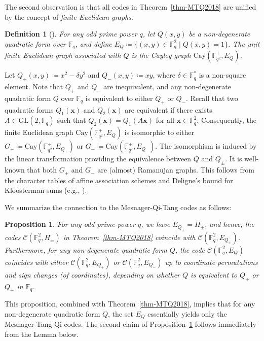 \documentclass{amsart}
\newtheorem{proposition}[theorem]{Proposition}
\newtheorem{definition}[theorem]{Definition}
\numberwithin{equation}{section}
\begin{document}
The second observation is that all codes in Theorem~\ref{thm-MTQ2018} are unified by the concept of {\it finite Euclidean graphs}.

\begin{definition}[\cite{BST2009, MMST1996}]
For any odd prime power $q$, let $Q(x, y)$ be a non-degenerate quadratic form over $\mathbb{F}_q$, and define $E_Q \coloneq \{(x,y) \in \mathbb{F}_q^2 \mid Q(x,y)=1\}$.
The {\it unit finite Euclidean graph} associated with $Q$ is the Cayley graph $\mathrm{Cay}(\mathbb{F}_{q^2}^+, E_Q)$.
\end{definition}

Let $Q_+(x,y) \coloneq x^2-\delta y^2$ and $Q_-(x,y) \coloneq xy$, where $\delta \in \mathbb{F}_q^*$ is a non-square element.
Note that $Q_+$ and $Q_-$ are inequivalent, and any non-degenerate quadratic form $Q$ over $\mathbb{F}_q$ is equivalent to either $Q_+$ or $Q_-$.
Recall that two quadratic forms $Q_1(\mathbf{x})$ and $Q_2(\mathbf{x})$ are equivalent if there exists $A \in \mathrm{GL}(2, \mathbb{F}_q)$ such that $Q_2(\mathbf{x})=Q_1(A\mathbf{x})$ for all $\mathbf{x} \in \mathbb{F}_q^2$.
Consequently, the finite Euclidean graph $\mathrm{Cay}(\mathbb{F}_{q^2}^+, E_Q)$ is isomorphic to either $G_+ \coloneq \mathrm{Cay}(\mathbb{F}_{q^2}^+, E_{Q_+})$ or $G_- \coloneq \mathrm{Cay}(\mathbb{F}_{q^2}^+, E_{Q_-})$. The isomorphism is induced by the linear transformation providing the equivalence between $Q$ and $Q_{\pm}$.
It is well-known that both $G_+$ and $G_-$ are (almost) Ramanujan graphs. This follows from the character tables of affine association schemes and Deligne's bound for Kloosterman sums (e.g., \cite{BST2009, MMST1996, D2023}).

We summarize the connection to the Mesnager-Qi-Tang codes as follows:

\begin{proposition}
\label{prop-euclid}
For any odd prime power $q$, we have $E_{Q_{\pm}}=H_{\pm}$, and hence, the codes $\mathcal{C}(\mathbb{F}_q^2, H_{\pm})$ in Theorem~\ref{thm-MTQ2018} coincide with $\mathcal{C}(\mathbb{F}_q^2, E_{Q_{\pm}})$.
Furthermore, for any non-degenerate quadratic form $Q$, the code $\mathcal{C}(\mathbb{F}_q^2, E_Q)$ coincides with either $\mathcal{C}(\mathbb{F}_q^2, E_{Q_{+}})$ or $\mathcal{C}(\mathbb{F}_q^2, E_{Q_{-}})$ up to coordinate permutations and sign changes (of coordinates), depending on whether $Q$ is equivalent to $Q_+$ or $Q_-$ in $\mathbb{F}_q$.
\end{proposition}

This proposition, combined with Theorem~\ref{thm-MTQ2018}, implies that for any non-degenerate quadratic form $Q$, the set $E_Q$ essentially yields only the Mesnager-Tang-Qi codes.
The second claim of Proposition~\ref{prop-euclid} follows immediately from the Lemma below.
\end{document}
